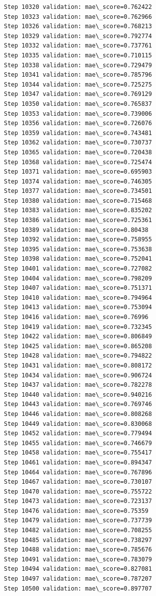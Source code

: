\documentclass[11pt]{article}
\begin{document}
\begin{Verbatim}[commandchars=\\\{\}]
Step 10320 validation: mae\_score=0.762422
Step 10323 validation: mae\_score=0.762966
Step 10326 validation: mae\_score=0.768213
Step 10329 validation: mae\_score=0.792774
Step 10332 validation: mae\_score=0.737761
Step 10335 validation: mae\_score=0.710115
Step 10338 validation: mae\_score=0.729479
Step 10341 validation: mae\_score=0.785796
Step 10344 validation: mae\_score=0.725275
Step 10347 validation: mae\_score=0.769129
Step 10350 validation: mae\_score=0.765837
Step 10353 validation: mae\_score=0.739006
Step 10356 validation: mae\_score=0.726076
Step 10359 validation: mae\_score=0.743481
Step 10362 validation: mae\_score=0.730737
Step 10365 validation: mae\_score=0.720438
Step 10368 validation: mae\_score=0.725474
Step 10371 validation: mae\_score=0.695903
Step 10374 validation: mae\_score=0.746305
Step 10377 validation: mae\_score=0.734501
Step 10380 validation: mae\_score=0.715468
Step 10383 validation: mae\_score=0.835202
Step 10386 validation: mae\_score=0.725361
Step 10389 validation: mae\_score=0.80438
Step 10392 validation: mae\_score=0.758955
Step 10395 validation: mae\_score=0.753638
Step 10398 validation: mae\_score=0.752041
Step 10401 validation: mae\_score=0.727082
Step 10404 validation: mae\_score=0.798209
Step 10407 validation: mae\_score=0.751371
Step 10410 validation: mae\_score=0.794964
Step 10413 validation: mae\_score=0.753094
Step 10416 validation: mae\_score=0.76996
Step 10419 validation: mae\_score=0.732345
Step 10422 validation: mae\_score=0.806849
Step 10425 validation: mae\_score=0.865208
Step 10428 validation: mae\_score=0.794822
Step 10431 validation: mae\_score=0.808172
Step 10434 validation: mae\_score=0.906724
Step 10437 validation: mae\_score=0.782278
Step 10440 validation: mae\_score=0.940216
Step 10443 validation: mae\_score=0.769746
Step 10446 validation: mae\_score=0.808268
Step 10449 validation: mae\_score=0.830068
Step 10452 validation: mae\_score=0.779494
Step 10455 validation: mae\_score=0.746679
Step 10458 validation: mae\_score=0.755417
Step 10461 validation: mae\_score=0.894347
Step 10464 validation: mae\_score=0.767896
Step 10467 validation: mae\_score=0.730107
Step 10470 validation: mae\_score=0.755722
Step 10473 validation: mae\_score=0.723137
Step 10476 validation: mae\_score=0.75359
Step 10479 validation: mae\_score=0.737739
Step 10482 validation: mae\_score=0.708255
Step 10485 validation: mae\_score=0.738297
Step 10488 validation: mae\_score=0.785676
Step 10491 validation: mae\_score=0.783079
Step 10494 validation: mae\_score=0.827081
Step 10497 validation: mae\_score=0.787207
Step 10500 validation: mae\_score=0.897707

\end{Verbatim}
\end{document}
